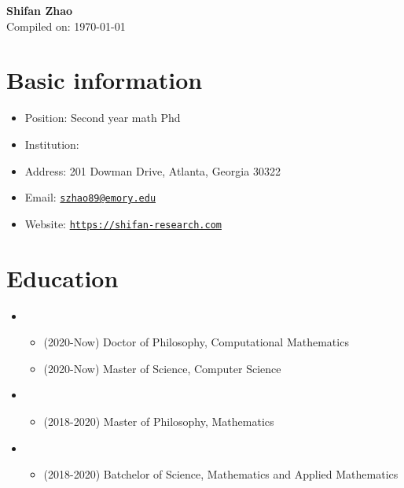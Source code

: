 

 


\begin{center}
    {\LARGE \bf Shifan Zhao} \\
    \medskip
    Compiled on: \today
\end{center}

\section{Basic information}
\begin{itemize}
    \item Position: Second year math Phd
    \item Institution: \EMU
    \item Address: 201 Dowman Drive, Atlanta, Georgia 30322
    \item Email: \href{mailto:szhao89@emory.edu}{\texttt{szhao89@emory.edu}}
    \item Website: \href{https://shifan-research.com}{\texttt{https://shifan-research.com}}
\end{itemize}

\section{Education}

\begin{itemize}
    \item \EMU
    \begin{itemize}
        \item (2020-Now) Doctor of Philosophy,  Computational Mathematics
        \item (2020-Now) Master of Science, Computer Science
    \end{itemize}
    \item \HKUST
    \begin{itemize}
        \item (2018-2020) Master of Philosophy, 
        Mathematics
    \end{itemize}
    \item \WHU
	\begin{itemize}
		\item (2018-2020) Batchelor of Science, 
		Mathematics and Applied Mathematics
	\end{itemize}
\end{itemize}


